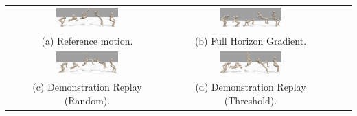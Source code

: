 \begin{table}[t]
    \centering
    \vspace{-10pt}
    \begin{tabular}{cccc}
      \hspace{-10pt}\includegraphics[width=0.4\textwidth]{figures/qp/backflip_demo.png}
      &  
      \includegraphics[width=0.4\textwidth]{figures/qp/backflip_trunc1000.png}
        \\
         (a) Reference motion.
         &
         (b) Full Horizon Gradient.
        \\
     \hspace{-10pt}\includegraphics[width=0.4\textwidth]{figures/qp/backflip_random.png}
      &  
      \includegraphics[width=0.4\textwidth]{figures/qp/backflip_err0.4.png}
        \\
        (c) Demonstration Replay (Random).
         &
        (d) Demonstration Replay (Threshold).
    \end{tabular}
    \label{fig:vis_ablation}
\end{table}





